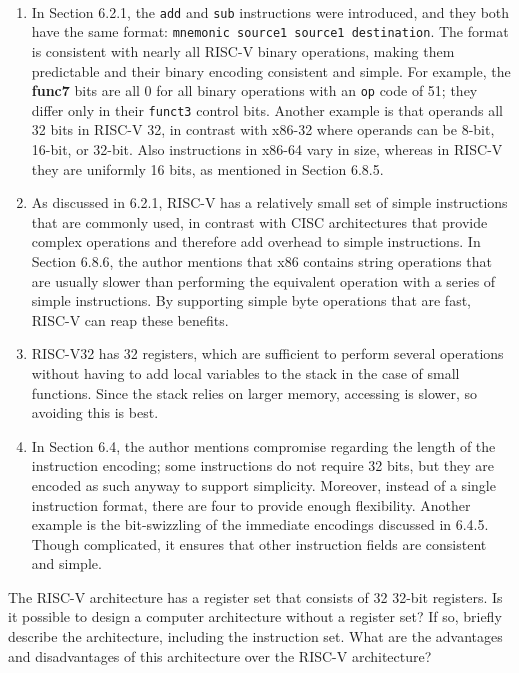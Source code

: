 \documentclass[12pt]{article}
\newenvironment{ex}[2][Exercise]{\begin{trivlist}
		\item[\hskip \labelsep {\bfseries #1}\hskip \labelsep {\bfseries #2.}]}{\end{trivlist}}
\newenvironment{sol}[1][Solution]{\begin{trivlist}
		\item[\hskip \labelsep {\bfseries #1:}]}{\end{trivlist}}
\begin{document}
\begin{sol}
	\
	\begin{enumerate}[label=(\arabic*)]
		\item In Section 6.2.1,  the \texttt{add} and \texttt{sub} instructions were
		introduced, and they both have the same format: \texttt{mnemonic source1 source1 destination}.
		The format is consistent with nearly all RISC-V binary operations, making them predictable
		and their binary encoding consistent and simple. For example, the \textbf{func7} bits are
		all 0 for all binary operations with an \texttt{op} code of 51; they differ only in their
		\texttt{funct3} control bits. Another example is that operands all 32 bits in RISC-V 32,
		in contrast with x86-32 where operands can be 8-bit, 16-bit, or 32-bit. Also instructions
		in x86-64 vary in size, whereas in RISC-V they are uniformly 16 bits, as mentioned
		in Section 6.8.5.
		\item As discussed in 6.2.1, RISC-V has a relatively small set of simple instructions
		that are commonly used, in contrast with CISC architectures that provide complex operations
		and therefore add overhead to simple instructions. In Section 6.8.6, the author mentions
		that x86 contains string operations that are usually slower than performing the equivalent
		operation with a series of simple instructions. By supporting simple byte operations that
		are fast, RISC-V can reap these benefits.
		\item RISC-V32 has 32 registers, which are sufficient to perform several operations
		without having to add local variables to the stack in the case of small functions.
		Since the stack relies on larger memory, accessing is slower, so avoiding this is best.
		\item In Section 6.4, the author mentions compromise regarding the length of the
		instruction encoding; some instructions do not require 32 bits, but they are encoded
		as such anyway to support simplicity. Moreover, instead of a single instruction format,
		there are four to provide enough flexibility. Another example is the bit-swizzling of
		the immediate encodings discussed in 6.4.5. Though complicated, it ensures that other
		instruction fields are consistent and simple.
	\end{enumerate}
\end{sol}

\begin{ex}{6.2}
	The RISC-V architecture has a register set that consists of 32 32-bit registers. Is it possible
	to design a computer architecture without a register set? If so, briefly describe the architecture,
	including the instruction set. What are the advantages and disadvantages of this architecture
	over the RISC-V architecture?
\end{ex}
\end{document}
